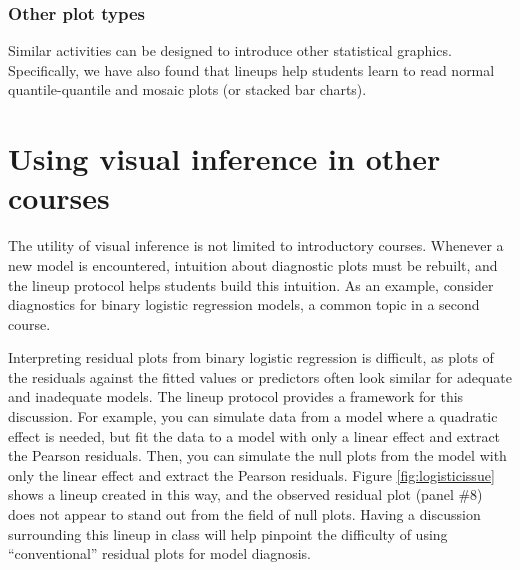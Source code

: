 \documentclass[12pt]{article}
\begin{document}
\hypertarget{other-plot-types}{%
\subsubsection{Other plot types}\label{other-plot-types}}

Similar activities can be designed to introduce other statistical
graphics. Specifically, we have also found that lineups help students
learn to read normal quantile-quantile and mosaic plots (or stacked bar
charts).

\hypertarget{using-visual-inference-in-other-courses}{%
\section{Using visual inference in other
courses}\label{using-visual-inference-in-other-courses}}

\label{sec:othercourses}

The utility of visual inference is not limited to introductory courses.
Whenever a new model is encountered, intuition about diagnostic plots
must be rebuilt, and the lineup protocol helps students build this
intuition. As an example, consider diagnostics for binary logistic
regression models, a common topic in a second course.

Interpreting residual plots from binary logistic regression is
difficult, as plots of the residuals against the fitted values or
predictors often look similar for adequate and inadequate models. The
lineup protocol provides a framework for this discussion. For example,
you can simulate data from a model where a quadratic effect is needed,
but fit the data to a model with only a linear effect and extract the
Pearson residuals. Then, you can simulate the null plots from the model
with only the linear effect and extract the Pearson residuals. Figure
\ref{fig:logisticissue} shows a lineup created in this way, and the
observed residual plot (panel \#8) does not appear to stand out from the
field of null plots. Having a discussion surrounding this lineup in
class will help pinpoint the difficulty of using ``conventional''
residual plots for model diagnosis.
\end{document}
